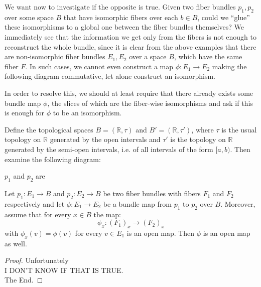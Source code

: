 We want now to investigate if the opposite is true. Given two fiber bundles $p_1, p_2$ over some space $B$ that have isomorphic fibers over each $b\in B$, could we ``glue'' these isomorphisms to a global one between the fiber bundles themselves? We immediately see that the information we get only from the fibers is not enough to reconstruct the whole bundle, since it is clear from the above examples that there are non-isomorphic fiber bundles $E_1, E_2$ over a space $B$, which have the same fiber $F$. In such cases, we cannot even construct a map $\phi:E_1\to E_2$ making the following diagram commutative, let alone construct an isomorphism.
\begin{center}
\end{center}
In order to resolve this, we should at least require that there already exists some bundle map $\phi$, the slices of which are the fiber-wise isomorphisms and ask if this is enough for $\phi$ to be an isomorphism.

\begin{example} Define the topological spaces $B=(\mathbb{R}, \tau)$ and $B'=(\mathbb{R}, \tau')$, where $\tau$ is the usual topology on $\mathbb{R}$ generated by the open intervals and $\tau'$ is the topology on $\mathbb{R}$ generated by the semi-open intervals, i.e. of all intervals of the form $[a,b)$. Then examine the following diagram:
\begin{center}
\end{center}
\end{example}
$p_1$ and $p_2$ are



\begin{lemma}\label{lem:open_fiberwise}
Let $p_1:E_1\to B$ and $p_2:E_2\to B$ be two fiber bundles with fibers $F_1$ and $F_2$ respectively and let $\phi:E_1\to E_2$ be a bundle map from $p_1$ to $p_2$ over $B$. Moreover, assume that for every $x\in B$ the map:
\[\phi_x:{\left(F_1\right)}_x\to{\left(F_2\right)}_x\]
with $\phi_x(v)=\phi(v)$ for every $v\in E_1$ is an open map. Then $\phi$ is an open map as well.
\end{lemma}
\begin{proof}
Unfortunately\\[3em]
I DON'T KNOW IF THAT IS TRUE.\\[3em]
The End.
\end{proof}

